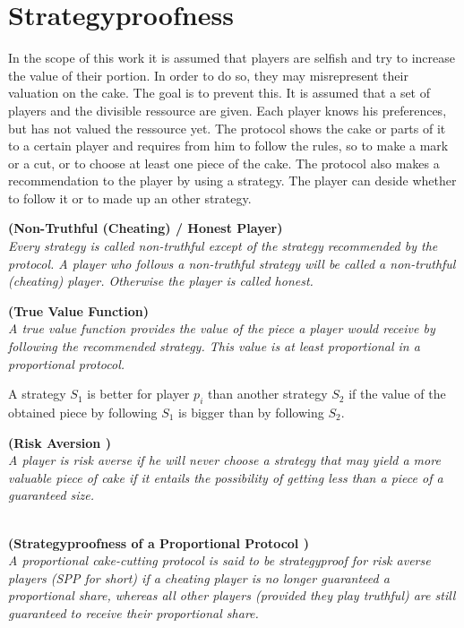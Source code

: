 \section{Strategyproofness}
\label{sven_hat_recht}
In the scope of this work it is assumed that players are selfish and try to increase the value of their portion. In order to do so, they may misrepresent their valuation on the cake. The goal is to prevent this.
It is assumed that a set of players and the divisible ressource are given. Each player knows his preferences, but has not valued the ressource yet. The protocol shows the cake or parts of it to a certain player and requires from him to follow the rules, so to make a mark or a cut, or to choose at least one piece of the cake. The protocol also makes a recommendation to the player by using a strategy. The player can deside whether to follow it or to made up an other strategy.
\begin{defi}{\textbf{(Non-Truthful (Cheating) / Honest Player)}}\\
\emph{Every strategy is called \emph{non-truthful} except of the strategy recommended by the protocol. A player who follows a non-truthful strategy will be called a \emph{non-truthful (cheating) player}. Otherwise the player is called \emph{honest}.}
\end{defi}
\begin{defi}{\textbf{(True Value Function)}}\\
\emph{A \emph{true value function} provides the value of the piece a player would receive by following the recommended strategy. This value is at least proportional in a proportional protocol.}
\end{defi}
A strategy $S_{1}$ is better for player $p_{i}$ than another strategy $S_{2}$ if the value of the obtained piece by following $S_{1}$ is bigger than by following $S_{2}$.
\begin{defi}{\textbf{(Risk Aversion \cite{brams})}}\\
\emph{A player is \emph{risk averse} if he will never choose a strategy that may yield a more valuable piece of cake if it entails the possibility of getting less than a piece of a guaranteed size.}
\end{defi}
\begin{defi}{\textbf{\\(Strategyproofness of a Proportional Protocol \cite{lindner:degrees})}}\\
\emph{A proportional cake-cutting protocol is said to be \emph{strategyproof for risk averse players} (SPP for short) if a cheating player is no longer guaranteed a proportional share, whereas all other players (provided they play truthful) are still guaranteed to receive their proportional share.}
\end{defi}

